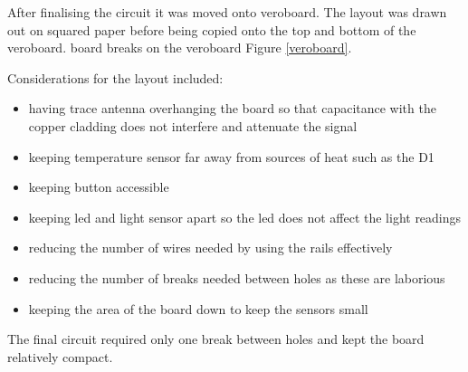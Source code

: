 \documentclass[bsc,frontabs,twoside,singlespacing,parskip,deptreport]{infthesis}
\begin{document}
After finalising the circuit it was moved onto veroboard.
The layout was drawn out on squared paper before being copied onto the top and bottom of the veroboard. board breaks on the veroboard Figure \ref{veroboard}. 

Considerations for the layout included:
\begin{itemize}
\item having trace antenna overhanging the board so that capacitance with the copper cladding does not interfere and attenuate the signal
\item keeping temperature sensor far away from sources of heat such as the D1
\item keeping button accessible
\item keeping led and light sensor apart so the led does not affect the light readings
\item reducing the number of wires needed by using the rails effectively
\item reducing the number of breaks needed between holes as these are laborious
\item keeping the area of the board down to keep the sensors small \\
\end{itemize}
The final circuit required only one break between holes and kept the board relatively compact. 
\end{document}
